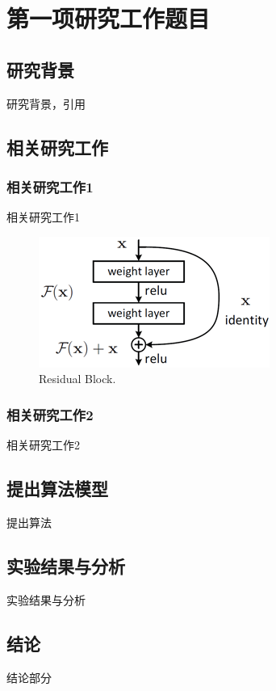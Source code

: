 \section{第一项研究工作题目}

\subsection{研究背景}
研究背景，引用\cite{ResNet}


\subsection{相关研究工作}

\subsubsection{相关研究工作1}
相关研究工作1

\begin{figure}[H]
  \centering
  \includegraphics[scale = 0.8]{pictures/1.jpg}
  \caption{\small Residual Block.}
  \label{Architecture}
\end{figure}


\subsubsection{相关研究工作2}
相关研究工作2


\subsection{提出算法模型}
提出算法

\subsection{实验结果与分析}
实验结果与分析

\subsection{结论}
结论部分

